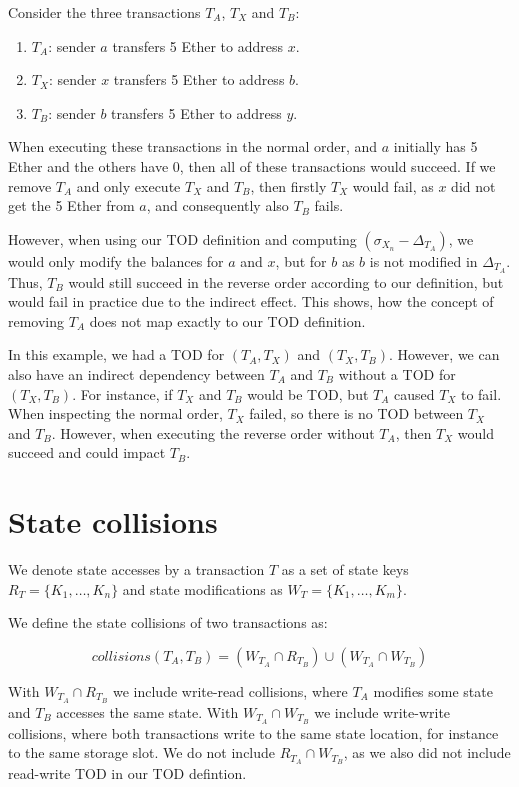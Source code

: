\documentclass[draft,final]{vutinfth} %
\begin{document}
Consider the three transactions $T_A$, $T_X$ and $T_B$:

\begin{enumerate}
    \item $T_A$: sender $a$ transfers 5 Ether to address $x$.
    \item $T_X$: sender $x$ transfers 5 Ether to address $b$.
    \item $T_B$: sender $b$ transfers 5 Ether to address $y$.
\end{enumerate}

When executing these transactions in the normal order, and $a$ initially has 5 Ether and the others have 0, then all of these transactions would succeed. If we remove $T_A$ and only execute $T_X$ and $T_B$, then firstly $T_X$ would fail, as $x$ did not get the 5 Ether from $a$, and consequently also $T_B$ fails.

However, when using our TOD definition and computing $(\sigma_{X_n} - \Delta_{T_A})$, we would only modify the balances for $a$ and $x$, but for $b$ as $b$ is not modified in $\Delta_{T_A}$. Thus, $T_B$ would still succeed in the reverse order according to our definition, but would fail in practice due to the indirect effect. This shows, how the concept of removing $T_A$ does not map exactly to our TOD definition.

In this example, we had a TOD for $(T_A, T_X)$ and $(T_X, T_B)$. However, we can also have an indirect dependency between $T_A$ and $T_B$ without a TOD for $(T_X, T_B)$. For instance, if $T_X$ and $T_B$ would be TOD, but $T_A$ caused $T_X$ to fail. When inspecting the normal order, $T_X$ failed, so there is no TOD between $T_X$ and $T_B$. However, when executing the reverse order without $T_A$, then $T_X$ would succeed and could impact $T_B$.

\section{State collisions}

We denote state accesses by a transaction $T$ as a set of state keys $R_T = \{ K_1, \dots, K_n \}$ and state modifications as $W_T = \{ K_1, \dots, K_m \}$.

We define the state collisions of two transactions as:

$$collisions(T_A, T_B) = (W_{T_A} \cap R_{T_B}) \cup (W_{T_A} \cap W_{T_B})$$

With $W_{T_A} \cap R_{T_B}$ we include write-read collisions, where $T_A$ modifies some state and $T_B$ accesses the same state. With $W_{T_A} \cap W_{T_B}$ we include write-write collisions, where both transactions write to the same state location, for instance to the same storage slot. We do not include $R_{T_A} \cap W_{T_B}$, as we also did not include read-write TOD in our TOD defintion.
\end{document}
